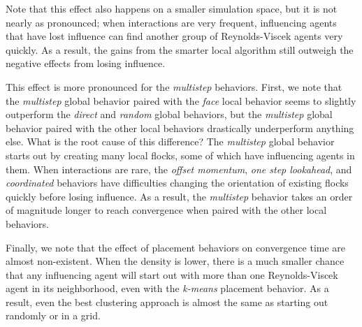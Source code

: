 Note that this effect also happens on a smaller simulation space, but it is
not nearly as pronounced; when interactions are very frequent, influencing
agents that have lost influence can find another group of Reynolds-Viscek
agents very quickly.
As a result, the gains from the smarter local algorithm still outweigh the
negative effects from losing influence.

This effect is more pronounced for the \textit{multistep} behaviors.
First, we note that the \textit{multistep} global behavior paired with the
\textit{face} local behavior seems to slightly outperform the \textit{direct}
and \textit{random} global behaviors, but the \textit{multistep} global behavior
paired with the other local behaviors drastically underperform anything else.
What is the root cause of this difference?
The \textit{multistep} global behavior starts out by creating many local flocks,
some of which have influencing agents in them.
When interactions are rare, the \textit{offset momentum}, \textit{one step
lookahead}, and \textit{coordinated} behaviors have difficulties changing the
orientation of existing flocks quickly before losing influence.
As a result, the \textit{multistep} behavior takes an order of magnitude longer
to reach convergence when paired with the other local behaviors.

Finally, we note that the effect of placement behaviors on convergence time
are almost non-existent.
When the density is lower, there is a much smaller chance that any influencing
agent will start out with more than one Reynolds-Viscek agent in its neighborhood,
even with the \textit{k-means} placement behavior.
As a result, even the best clustering approach is almost the same as starting
out randomly or in a grid.

